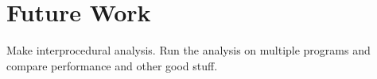 \section{Future Work}
Make interprocedural analysis. Run the  analysis on multiple programs and compare performance and other good stuff.
